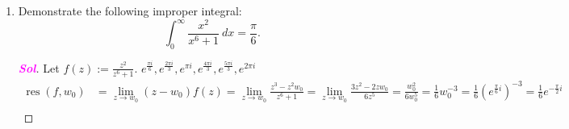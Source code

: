 \documentclass{article}
\theoremstyle{definition}
\newcommand{\of}[1]{\left( #1 \right)}
\newcommand{\abs}[1]{\left\lvert #1 \right\rvert}
\newcommand{\sol}{\textcolor{magenta}{\bf Sol}}
\newcommand{\res}{\operatorname{res}}
\DeclareMathOperator*{\Res}{\operatorname{Res}}
\begin{document}
\begin{enumerate}[\bf 1.]
\begin{proof}[\sol]
\begin{center}
\begin{tikzpicture}[scale=1]
			\end{tikzpicture} then \[
			\Res_{z=-2+i}\left[f(z)e^{iz}\right]=\Res_{z=-2+i}\left[\frac{\phi(z)}{z+2-i}\right]=\phi(-2+i)=\frac{e^{i(-2+i)}}{2i}=\frac{e^{-2i}e^{-1}}{2i}=\frac{\cos(-2)+i\sin(-2)}{2e i}=\frac{\cos 2-i\sin 2}{2ei}.
			\]
		\end{center} Consider \[
		\oint_Cf(z)e^{iz}\ dz=\underbrace{\int_{C_R}f(z)e^{iz}\ dz}_{=\text{(1)}}+\underbrace{\int_{I_R}f(z)e^{iz}\ dz}_{=\text{(2)}}.
		\]
		\begin{enumerate}[(1)]
			\item Note that $\abs{f(z)}=\abs{\frac{1}{z^2+4z+5}}\leq\frac{1}{\abs{z}^2+\abs{4z}+5}=\frac{1}{R^2+4R+5}\to 0$ as $R\to\infty$, and so \[
			\lim\limits_{R\to\infty}\int_{C_R}f(z)e^{iz}\ dz=0
			\] by Jordan's Lemma.
			\item \[
			\int_{I_R}f(z)e^{iz}\ dz=\int_{-R}^R\frac{1}{x^2+4x+5}\cos x\ dx+i\int_{-R}^R\frac{1}{x^2+4x+5}\sin x\ dx.
			\]
		\end{enumerate}
		\vspace{4pt}
		Therefore, by (1) and (2), \begin{align*}
			\lim\limits_{R\to\infty}\oint_C f(z)e^{iz}\ dz&=\int_{-\infty}^{\infty}\frac{1}{x^2+4x+5}\cos x\ dx+i\int_{-\infty}^{\infty}\frac{1}{x^2+4x+5}\sin x\ dx\\
			&=2\pi i\cdot\res\of{f(z)e^{iz}, -2+i}\quad\text{by Residue Theorem}\\
			&=2\pi i\cdot \frac{\cos 2-i\sin 2}{2ei}\\
			&=\frac{\pi\cos 2}{e}+i\of{-\frac{\pi\sin 2}{e}}.
		\end{align*} Hence \[
		\int_{-\infty}^\infty\frac{\sin x}{x^2+4x+5}\ dx=-\frac{\pi}{e}\sin 2.
		\]
	\end{proof}
	\item Demonstrate the following improper integral: \[
	\int_0^{\infty}\frac{x^2}{x^6+1}\ dx=\frac{\pi}{6}.
	\] \begin{proof}[\sol]
		Let $\displaystyle f(z):=\frac{z^2}{z^6+1}$. $e^{\frac{\pi i}{6}}, e^{\frac{2\pi i}{3}},e^{\pi i}, e^{\frac{4\pi i}{3}},e^{\frac{5\pi i}{3}}, e^{2\pi i}$ \begin{align*}
			\res\of{f,w_0}&=\lim\limits_{z\to w_0}(z-w_0)f(z)=\lim\limits_{z\to w_0}\frac{z^3-z^2w_0}{z^6+1}=\lim\limits_{z\to w_0}\frac{3z^2-2zw_0}{6z^5}=\frac{w_0^2}{6w_0^5}=\frac{1}{6}w_0^{-3}=\frac{1}{6}\of{e^{\frac{\pi}{6}i}}^{-3}=\frac{1}{6}e^{-\frac{\pi}{2}i}\\

\end{align*}
\end{proof}
\end{enumerate}
\end{document}

